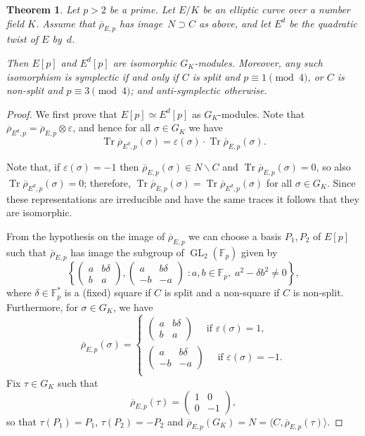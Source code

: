 \documentclass[12pt]{amsart}
\newcommand{\F}{\mathbb{F}}
\newcommand{\rhobar}{{\overline{\rho}}}
\newcommand{\eps}{\varepsilon}
\DeclareMathOperator{\Tr}{Tr}
\newcommand{\GL}{\operatorname{GL}}
\numberwithin{equation}{section}
\newtheorem{theorem}{Theorem}[section]
\theoremstyle{definition}
\theoremstyle{remark}
\begin{document}
\begin{theorem} \label{T:Cartan}
Let $p > 2$ be a prime. Let $E/K$ be an elliptic curve 
over a number field $K$. Assume that $\rhobar_{E,p}$ has image~$N
\supset C$ as above, and let $E^d$ be the quadratic twist of $E$
by~$d$.

Then $E[p]$ and $E^d[p]$ are isomorphic $G_K$-modules. Moreover, any
such isomorphism is symplectic if and only if $C$ is split and $p
\equiv 1 \pmod{4}$, or $C$ is non-split and $p \equiv 3 \pmod{4}$; and
anti-symplectic otherwise.
\end{theorem}

\begin{proof} We first prove that $E[p] \simeq E^d[p]$ as $G_K$-modules. 
Note that $\rhobar_{{E^d}, p} = \rhobar_{E, p} \otimes \eps$, and
hence for all $\sigma \in G_K$ we have
\[\Tr \rhobar_{{E^d},p}(\sigma) = \eps(\sigma) \cdot \Tr \rhobar_{E,p}(\sigma).\]

Note that, if $\eps(\sigma) = -1$ then $\rhobar_{E,p}(\sigma) \in N\backslash C$ and $\Tr \rhobar_{E,p}(\sigma) = 0$, so also $\Tr \rhobar_{E^d,p}(\sigma) = 0$;
therefore, $\Tr \rhobar_{E,p}(\sigma) = \Tr \rhobar_{E^d,p}(\sigma)$ 
for all $\sigma \in G_K$. Since these representations are irreducible and have
the same traces it follows that they are isomorphic.

From the hypothesis on the image of $\rhobar_{E,p}$ we can 
choose a basis $P_1, P_2$ of $E[p]$ such that $\rhobar_{E,p}$ has image 
the subgroup of $\GL_2(\F_p)$ given by 
\[
\left\{ 
\begin{pmatrix}
a & b\delta \\
b & a
\end{pmatrix}, 
\begin{pmatrix}
a & b\delta \\
-b & -a
\end{pmatrix}  \; : a, b \in \F_p, \; a^2 - \delta b^2 \neq 0 \right\},
\]
where $\delta \in \F_p^*$ is a (fixed) square if $C$ is split and a
non-square if $C$ is non-split. Furthermore, for $\sigma \in G_K$, we
have
\[
 \rhobar_{E,p}(\sigma) = \begin{cases} 
                            \begin{pmatrix}
                            a & b\delta \\
                            b & a
                            \end{pmatrix} \quad \text{ if } \eps(\sigma) = 1,  \\
\begin{pmatrix}
a & b\delta \\
-b & -a
\end{pmatrix} \quad \text{ if } \eps(\sigma) = -1.  \\
\end{cases}\]
Fix $\tau \in G_K$ such that 
\[
 \rhobar_{E,p}(\tau) =  \begin{pmatrix}
                            1 & 0 \\
                            0 & -1
                            \end{pmatrix},
\]
so that  $\tau(P_1) = P_1$, $\tau(P_2) = -P_2$ and 
$\rhobar_{E,p}(G_K) = N = \langle C,\rhobar_{E,p}(\tau) \rangle$.


\end{proof}
\end{document}
